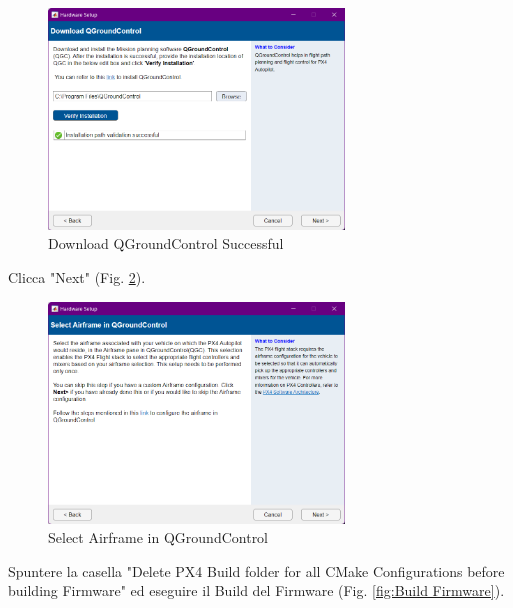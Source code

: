 \begin{figure}[H] %
  \centering
  \includegraphics[width=0.7\textwidth]{files/images/matlab11.png} %
  \caption{Download QGroundControl Successful} %
  \label{fig:Download QGroundControl Successful} %
\end{figure}
\noindent
Clicca "Next" (Fig. \ref{fig:Select Airframe in QGroundControl}).
\begin{figure}[H] %
  \centering
  \includegraphics[width=0.7\textwidth]{files/images/matlab12.png} %
  \caption{Select Airframe in QGroundControl} %
  \label{fig:Select Airframe in QGroundControl} %
\end{figure}
\noindent
Spuntere la casella "Delete PX4 Build folder for all CMake Configurations before building Firmware" ed eseguire il Build del Firmware (Fig. \ref{fig:Build Firmware}).
